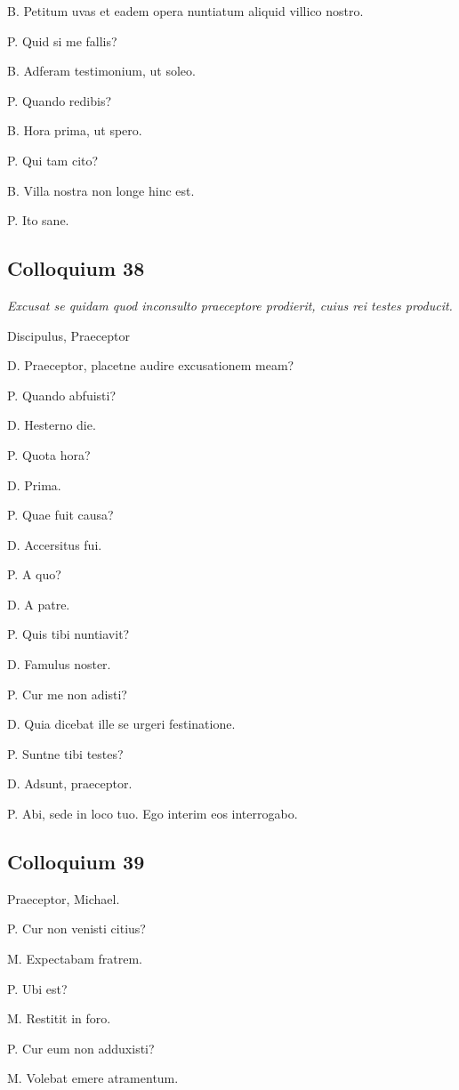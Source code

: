 \documentclass{article}
\begin{document}
B. Petitum uvas et eadem opera nuntiatum aliquid villico nostro.

P. Quid si me fallis?

B. Adferam testimonium, ut soleo.

P. Quando redibis?

B. Hora prima, ut spero.

P. Qui tam cito?

B. Villa nostra non longe hinc est.

P. Ito sane.

\subsection{Colloquium 38}
\emph{Excusat se quidam quod inconsulto praeceptore prodierit, cuius rei testes producit.}

Discipulus, Praeceptor

D. Praeceptor, placetne audire excusationem meam?

P. Quando abfuisti?

D. Hesterno die.

P. Quota hora?

D. Prima.

P. Quae fuit causa?

D. Accersitus fui.

P. A quo?

D. A patre.

P. Quis tibi nuntiavit?

D. Famulus noster.

P. Cur me non adisti?

D. Quia dicebat ille se urgeri festinatione.

P. Suntne tibi testes?

D. Adsunt, praeceptor.

P. Abi, sede in loco tuo. Ego interim eos interrogabo.

\subsection{Colloquium 39}
Praeceptor, Michael.

P. Cur non venisti citius?

M. Expectabam fratrem.

P. Ubi est?

M. Restitit in foro.

P. Cur eum non adduxisti?

M. Volebat emere atramentum.
\end{document}
